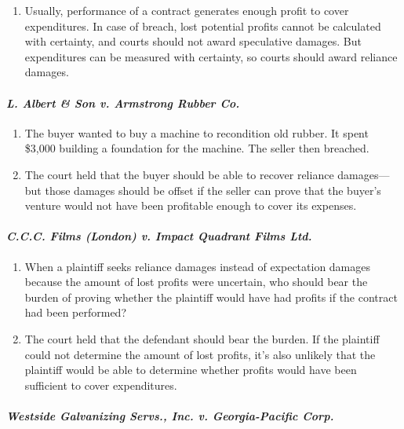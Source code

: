 \begin{enumerate}
    \item Usually, performance of a contract generates enough profit to cover 
    expenditures. In case of breach, lost potential profits cannot be 
    calculated with certainty, and courts should not award speculative 
    damages. But expenditures can be measured with certainty, so courts should 
    award reliance damages.
\end{enumerate}

\paragraph{\emph{L. Albert \& Son v. Armstrong Rubber Co.}}

\begin{enumerate}
    \item The buyer wanted to buy a machine to recondition old rubber. It 
    spent \$3,000 building a foundation for the machine. The seller then 
    breached.
    \item The court held that the buyer should be able to recover reliance 
    damages---but those damages should be offset if the seller can prove that 
    the buyer's venture would not have been profitable enough to cover its 
    expenses.
\end{enumerate}

\paragraph{\emph{C.C.C. Films (London) v. Impact Quadrant Films Ltd.}}
\begin{enumerate}
    \item When a plaintiff seeks reliance damages instead of expectation 
    damages because the amount of lost profits were uncertain, who should bear 
    the burden of proving whether the plaintiff would have had profits if the 
    contract had been performed?
    \item The court held that the defendant should bear the burden. If the 
    plaintiff could not determine the amount of lost profits, it's also 
    unlikely that the plaintiff would be able to determine whether profits 
    would have been sufficient to cover expenditures.
\end{enumerate}

\paragraph{\emph{Westside Galvanizing Servs., Inc. v. Georgia-Pacific Corp.}}

